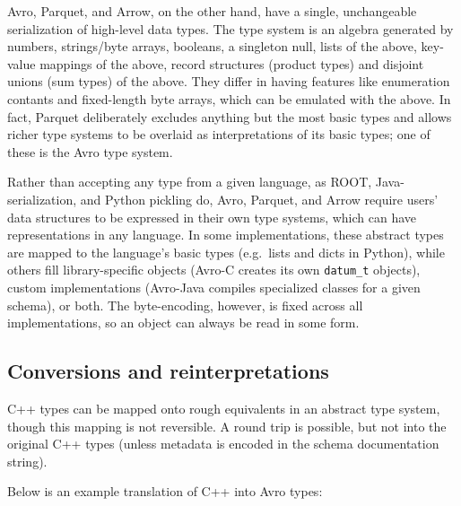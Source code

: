 \documentclass{article}
\begin{document}
Avro, Parquet, and Arrow, on the other hand, have a single, unchangeable serialization of high-level data types. The type system is an algebra generated by numbers, strings/byte arrays, booleans, a singleton null, lists of the above, key-value mappings of the above, record structures (product types) and disjoint unions (sum types) of the above. They differ in having features like enumeration contants and fixed-length byte arrays, which can be emulated with the above. In fact, Parquet deliberately excludes anything but the most basic types and allows richer type systems to be overlaid as interpretations of its basic types; one of these is the Avro type system.

Rather than accepting any type from a given language, as ROOT, Java-serialization, and Python pickling do, Avro, Parquet, and Arrow require users' data structures to be expressed in their own type systems, which can have representations in any language. In some implementations, these abstract types are mapped to the language's basic types (e.g.\ lists and dicts in Python), while others fill library-specific objects (Avro-C creates its own {\tt datum\_t} objects), custom implementations (Avro-Java compiles specialized classes for a given schema), or both. The byte-encoding, however, is fixed across all implementations, so an object can always be read in some form.

\subsection*{Conversions and reinterpretations}

C++ types can be mapped onto rough equivalents in an abstract type system, though this mapping is not reversible. A round trip is possible, but not into the original C++ types (unless metadata is encoded in the schema documentation string).

Below is an example translation of C++ into Avro types:
\end{document}
